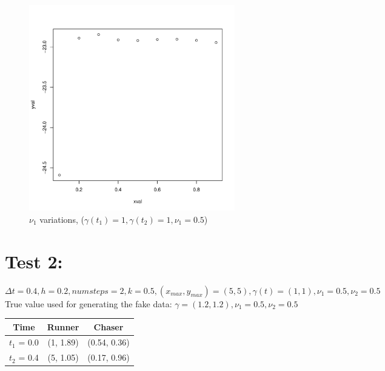 \documentclass[a4paper,11pt]{article}
\begin{document}
\begin{figure}[H]
\centering
\includegraphics[width=0.8\textwidth]{test1_nu2.pdf}
\caption{$\nu_1$ variations, ($\gamma(t_1) = 1, \gamma(t_2) = 1, \nu_1 = 0.5$)}
\end{figure}



\section{Test 2:}
$\Delta t = 0.4, h = 0.2, numsteps = 2, k = 0.5, (x_{max}, y_{max}) = (5,5), \gamma(t) = (1,1), \nu_1 = 0.5, \nu_2 = 0.5$ \\

True value used for generating the fake data: $\gamma = (1.2, 1.2), \nu_1 = 0.5, \nu_2 = 0.5$
\begin{table}[H]
\centering
\begin{tabular}{|c|c|c|}
\hline
Time   & Runner & Chaser \\ \hline
$t_1$ = 0.0 & (1, 1.89)  & (0.54, 0.36)  \\ \hline
$t_2$ = 0.4 & (5, 1.05) &  (0.17, 0.96) \\ \hline
\end{tabular}
\end{table}
\end{document}

